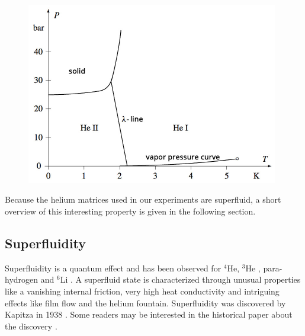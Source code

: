 \documentclass[parskip,12pt,headsepline,a4paper] {scrbook}
\begin{document}
\begin{figure}[ht]
\centerline{
\includegraphics[width=11cm]{./helium/phasediagram.jpg}}
\end{figure}

Because the helium matrices used in our experiments are superfluid, a short overview of this interesting property is given in the following section.

\subsection{Superfluidity}
\vspace{-1\baselineskip}
Superfluidity is a quantum effect and has been observed for $^4$He, $^3$He \cite{only-superfluid}, para-hydrogen \cite{superh} and $^6$Li \cite{superli}. A superfluid state is characterized through unusual properties like a vanishing internal friction, very high heat conductivity and intriguing effects like film flow and the helium fountain. Superfluidity was discovered by Kapitza in 1938 \cite{kapitza}. Some readers may be interested in the historical paper about the discovery \cite{super-story}.
\end{document}
